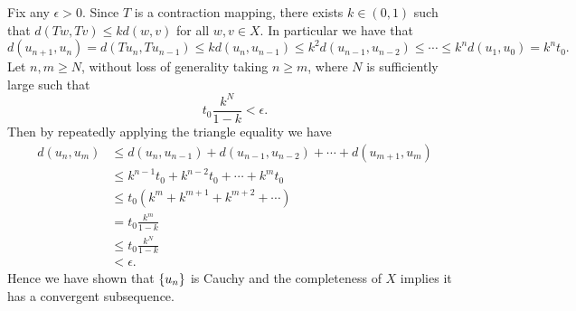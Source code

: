 \documentclass{article}
\begin{document}
Fix any $\epsilon > 0$. Since $T$ is a contraction mapping, there exists
$k \in (0, 1)$ such that $d(Tw, Tv) \leq k d(w, v)$ for all $w, v \in
X$. In particular we have that
%
\begin{equation*}
    d(u_{n + 1}, u_n) = d(T u_n, T u_{n - 1}) \leq k d(u_n, u_{n - 1}) \leq k^2 d(u_{n - 1}, u_{n - 2}) \leq \cdots \leq k^n d(u_1, u_0) = k^n t_0
    .
\end{equation*}
%
Let $n, m \geq N$, without loss of generality taking $n \geq m$, where $N$ is sufficiently large such that
%
\begin{equation*}
    t_0 \frac{k^N}{1 - k} < \epsilon
    .
\end{equation*}
%
Then by repeatedly applying the triangle equality we have
%
\begin{align*}
    d(u_n, u_m) &\leq d(u_n, u_{n - 1}) + d(u_{n - 1}, u_{n - 2}) + \cdots + d(u_{m + 1}, u_m) \\
                &\leq k^{n - 1} t_0 + k^{n - 2} t_0 + \cdots + k^{m} t_0 \\
                &\leq t_0 (k^m + k^{m + 1} + k^{m + 2} + \cdots) \\
                &= t_0 \frac{k^m}{1 - k} \\
                &\leq t_0 \frac{k^N}{1 - k} \\
                &< \epsilon
                .
\end{align*}
%
Hence we have shown that $\cbr{u_n}$ is Cauchy and the completeness of
$X$ implies it has a convergent subsequence.
\end{document}
